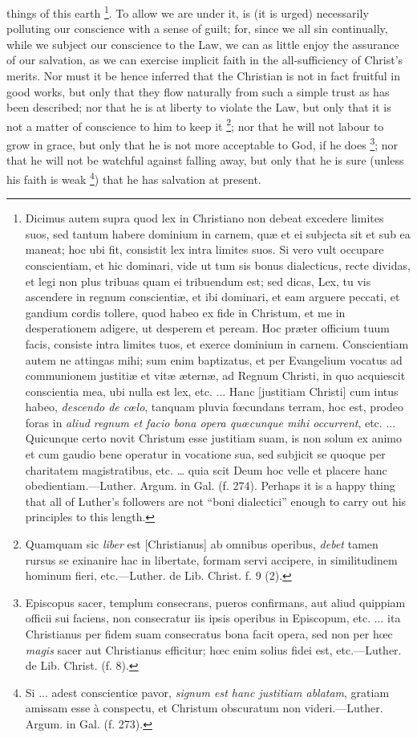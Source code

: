 things of this earth \footnote{Dicimus autem
supra quod lex in Christiano non debeat excedere limites suos, sed
tantum habere dominium in carnem, quæ et ei subjecta sit et sub ea
maneat; hoc ubi fit, consistit lex intra limites suos. Si vero vult
occupare conscientiam, et hic dominari, vide ut tum sis bonus
dialecticus, recte dividas, et legi non plus tribuas quam ei
tribuendum est; sed dicas, Lex, tu vis ascendere in regnum
conscientiæ, et ibi dominari, et eam arguere peccati, et gandium
cordis tollere, quod habeo ex fide in Christum, et me in desperationem
adigere, ut desperem et peream. Hoc præter officium tuum facis,
consiste intra limites tuos, et exerce dominium in carnem.
Conscientiam autem ne attingas mihi; sum enim baptizatus, et per
Evangelium vocatus ad communionem justitiæ et vitæ æternæ, ad
Regnum Christi, in quo acquiescit conscientia mea, ubi nulla est lex,
etc. ... Hanc [justitiam Christi] cum intus habeo, \emph{descendo de cœlo}, tanquam pluvia fœcundans terram, hoc est, prodeo foras in \emph{aliud
regnum et facio bona opera quœcunque mihi occurrent}, etc. ...
Quicunque certo novit Christum esse justitiam suam, is non solum ex
animo et cum gaudio bene operatur in vocatione sua, sed subjicit se
quoque per charitatem magistratibus, etc. … quia scit Deum hoc velle
et placere hanc obedientiam.—Luther. Argum. in Gal. (f. 274).
Perhaps it is a happy thing that all of Luther's followers are not
``boni dialectici'' enough to carry out his principles to this
length.}. To allow we are under it, is (it is
urged) necessarily polluting our conscience with a sense of guilt;
for, since we all sin continually, while we subject our conscience to
the Law, we can as little enjoy the assurance of our salvation, as we
can exercise implicit faith in the all-sufficiency of Christ's merits.
Nor must it be hence inferred that the Christian is not in fact
fruitful in good works, but only that they flow naturally from such a
simple trust as has been described; nor that he is at liberty to
violate the Law, but only that it is not a matter of conscience to him
to keep it \footnote{Quamquam sic \emph{liber}
est [Christianus] ab omnibus operibus, \emph{debet} tamen rursus se exinanire
hac in libertate, formam servi accipere, in similitudinem hominum
fieri, etc.—Luther. de Lib. Christ. f. 9 (2).}; nor that he will not labour to grow in
grace, but only that he is not more acceptable to God, if he does \footnote{Episcopus
sacer, templum consecrans, pueros confirmans, aut aliud quippiam
officii sui faciens, non consecratur iis ipsis operibus in Episcopum,
etc. ... ita Christianus per fidem suam consecratus bona facit opera,
sed non per hœc \emph{magis} sacer aut Christianus
efficitur; hœc
enim solius fidei est, etc.—Luther. de Lib. Christ. (f. 8).}; nor that he will not be watchful against falling away, but
only that he is sure (unless his faith is weak \footnote{Si ... adest
conscientiœ pavor, \emph{signum est hanc justitiam
ablatam}, gratiam amissam
esse à conspectu, et Christum obscuratum non videri.—Luther. Argum.
in Gal. (f. 273).}) that he has
salvation at present.

